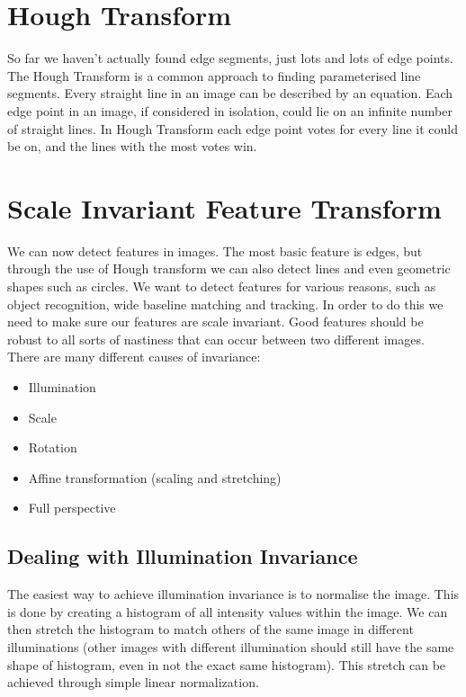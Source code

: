 \documentclass{article}
\begin{document}
	\section{Hough Transform}
	So far we haven't actually found edge segments, just lots and lots of edge points. The Hough Transform is a common approach to finding parameterised line segments. Every straight line in an image can be described by an equation. Each edge point in an image, if considered in isolation, could lie on an infinite number of straight lines. In Hough Transform each edge point votes for every line it could be on, and the lines with the most votes win.

	\section{Scale Invariant Feature Transform}
	We can now detect features in images. The most basic feature is edges, but through the use of Hough transform we can also detect lines and even geometric shapes such as circles. We want to detect features for various reasons, such as object recognition, wide baseline matching and tracking. In order to do this we need to make sure our features are scale invariant. Good features should be robust to all sorts of nastiness that can occur between two different images. There are many different causes of invariance:
	\begin{itemize}
		\item Illumination
		\item Scale
		\item Rotation
		\item Affine transformation (scaling and stretching)
		\item Full perspective
	\end{itemize}
	
	\subsection{Dealing with Illumination Invariance}
	The easiest way to achieve illumination invariance is to normalise the image. This is done by creating a histogram of all intensity values within the image. We can then stretch the histogram to match others of the same image in different illuminations (other images with different illumination should still have the same shape of histogram, even in not the exact same histogram). This stretch can be achieved through simple linear normalization.
	
\end{document}
